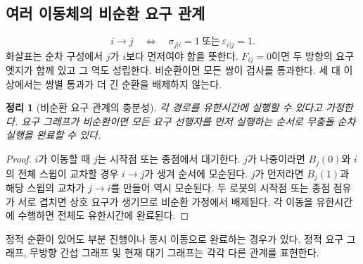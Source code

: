 \documentclass[11pt,a4paper]{article}
\newtheorem{theorem}{정리}
\theoremstyle{remark}
\begin{document}
\subsection{여러 이동체의 비순환 요구 관계}
\begin{equation}
 i\longrightarrow j\quad\Longleftrightarrow\quad
 \sigma_{j|i}=1\ \text{또는}\ \varepsilon_{i|j}=1.
 \label{eq:precedence}
\end{equation}
화살표는 순차 구성에서 $j$가 $i$보다 먼저여야 함을 뜻한다. $F_{ij}=0$이면 두 방향의 요구 엣지가 함께 있고 그 역도 성립한다. 비순환이면 모든 쌍이 검사를 통과한다. 세 대 이상에서는 쌍별 통과가 더 긴 순환을 배제하지 않는다.
\begin{theorem}[비순환 요구 관계의 충분성]
\label{thm:dag}
각 경로를 유한시간에 실행할 수 있다고 가정한다. 요구 그래프가 비순환이면 모든 요구 선행자를 먼저 실행하는 순서로 무충돌 순차 실행을 완료할 수 있다.
\end{theorem}
\begin{proof}
$i$가 이동할 때 $j$는 시작점 또는 종점에서 대기한다. $j$가 나중이라면 $B_j(0)$와 $i$의 전체 스윕이 교차할 경우 $i\to j$가 생겨 순서에 모순된다. $j$가 먼저라면 $B_j(1)$과 해당 스윕의 교차가 $j\to i$를 만들어 역시 모순된다. 두 로봇의 시작점 또는 종점 점유가 서로 겹치면 상호 요구가 생기므로 비순환 가정에서 배제된다. 각 이동을 유한시간에 수행하면 전체도 유한시간에 완료된다.
\end{proof}
정적 순환이 있어도 부분 진행이나 동시 이동으로 완료하는 경우가 있다. 정적 요구 그래프, 무방향 간섭 그래프 및 현재 대기 그래프는 각각 다른 관계를 표현한다.
\end{document}
